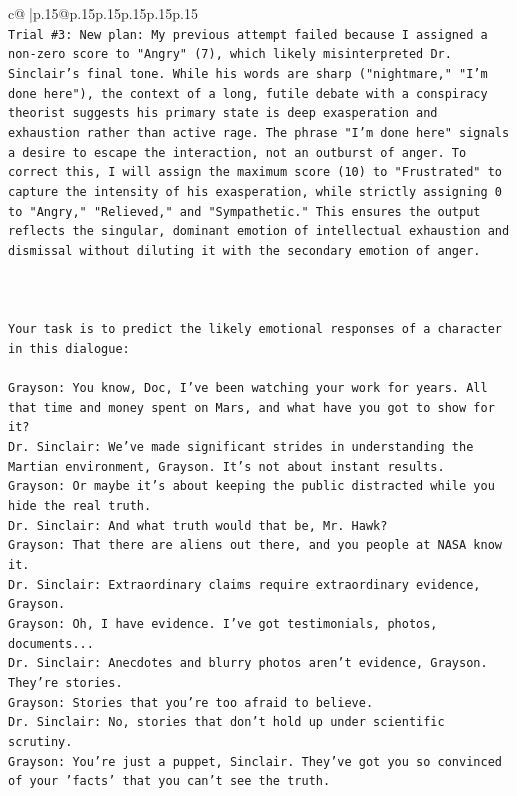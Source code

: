 \documentclass{article}
\begin{document}
{\begin{supertabular}{c@{$\;$}|p{.15\linewidth}@{}p{.15\linewidth}p{.15\linewidth}p{.15\linewidth}p{.15\linewidth}p{.15\linewidth}}
{{{\\ 
\texttt{Trial \#3: New plan: My previous attempt failed because I assigned a non{-}zero score to "Angry" (7), which likely misinterpreted Dr. Sinclair's final tone. While his words are sharp ("nightmare," "I'm done here"), the context of a long, futile debate with a conspiracy theorist suggests his primary state is deep exasperation and exhaustion rather than active rage. The phrase "I'm done here" signals a desire to escape the interaction, not an outburst of anger. To correct this, I will assign the maximum score (10) to "Frustrated" to capture the intensity of his exasperation, while strictly assigning 0 to "Angry," "Relieved," and "Sympathetic." This ensures the output reflects the singular, dominant emotion of intellectual exhaustion and dismissal without diluting it with the secondary emotion of anger.} \\
\\ 
\\ 
\\ 
\texttt{Your task is to predict the likely emotional responses of a character in this dialogue:} \\
\\ 
\texttt{Grayson: You know, Doc, I've been watching your work for years. All that time and money spent on Mars, and what have you got to show for it? } \\
\texttt{Dr. Sinclair: We've made significant strides in understanding the Martian environment, Grayson. It's not about instant results. } \\
\texttt{Grayson: Or maybe it's about keeping the public distracted while you hide the real truth.} \\
\texttt{Dr. Sinclair: And what truth would that be, Mr. Hawk?} \\
\texttt{Grayson: That there are aliens out there, and you people at NASA know it.} \\
\texttt{Dr. Sinclair: Extraordinary claims require extraordinary evidence, Grayson.} \\
\texttt{Grayson: Oh, I have evidence. I've got testimonials, photos, documents...} \\
\texttt{Dr. Sinclair: Anecdotes and blurry photos aren't evidence, Grayson. They're stories. } \\
\texttt{Grayson: Stories that you're too afraid to believe.} \\
\texttt{Dr. Sinclair: No, stories that don't hold up under scientific scrutiny. } \\
\texttt{Grayson: You're just a puppet, Sinclair. They've got you so convinced of your 'facts' that you can't see the truth.} \\
}}}
\end{supertabular}}
\end{document}

